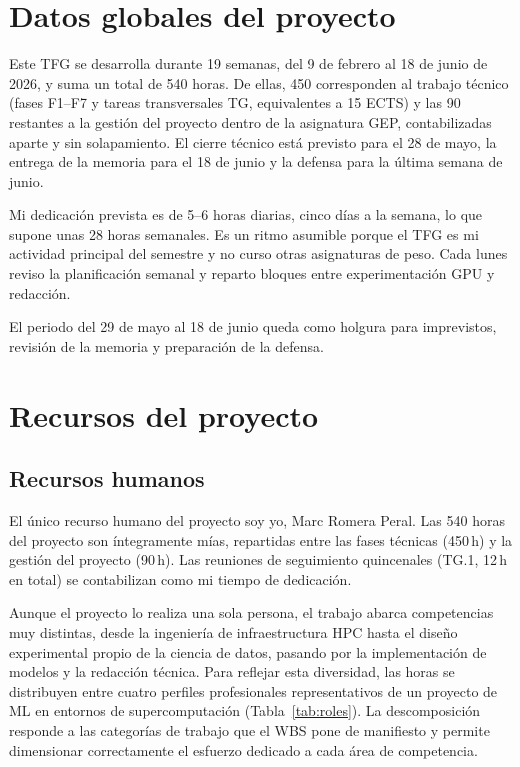 \documentclass[11pt,a4paper]{article}
\begin{document}

\section{Datos globales del proyecto}

Este TFG se desarrolla durante 19 semanas, del 9 de febrero al 18 de junio de 2026, y suma un total de 540 horas. De ellas, 450 corresponden al trabajo técnico (fases F1--F7 y tareas transversales TG, equivalentes a 15 ECTS) y las 90 restantes a la gestión del proyecto dentro de la asignatura GEP, contabilizadas aparte y sin solapamiento. El cierre técnico está previsto para el 28 de mayo, la entrega de la memoria para el 18 de junio y la defensa para la última semana de junio.

Mi dedicación prevista es de 5--6 horas diarias, cinco días a la semana, lo que supone unas 28 horas semanales. Es un ritmo asumible porque el TFG es mi actividad principal del semestre y no curso otras asignaturas de peso. Cada lunes reviso la planificación semanal y reparto bloques entre experimentación GPU y redacción.

El periodo del 29 de mayo al 18 de junio queda como holgura para imprevistos, revisión de la memoria y preparación de la defensa.

\section{Recursos del proyecto}

\subsection{Recursos humanos}

El único recurso humano del proyecto soy yo, Marc Romera Peral. Las 540 horas del proyecto son íntegramente mías, repartidas entre las fases técnicas (450\,h) y la gestión del proyecto (90\,h). Las reuniones de seguimiento quincenales (TG.1, 12\,h en total) se contabilizan como mi tiempo de dedicación.

Aunque el proyecto lo realiza una sola persona, el trabajo abarca competencias muy distintas, desde la ingeniería de infraestructura HPC hasta el diseño experimental propio de la ciencia de datos, pasando por la implementación de modelos y la redacción técnica. Para reflejar esta diversidad, las horas se distribuyen entre cuatro perfiles profesionales representativos de un proyecto de ML en entornos de supercomputación (Tabla~\ref{tab:roles}). La descomposición responde a las categorías de trabajo que el WBS pone de manifiesto y permite dimensionar correctamente el esfuerzo dedicado a cada área de competencia.
\end{document}
